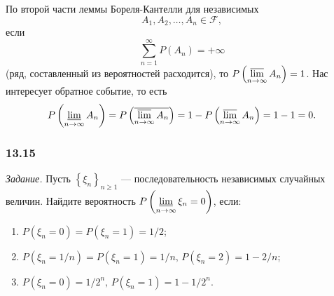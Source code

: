 По второй части леммы Бореля-Кантелли для независимых
$$A_1, A_2, \dotsc, A_n \in \mathcal{F},$$
если
$$ \sum \limits_{n=1}^{ \infty } P \left( A_n \right) =
+ \infty $$
(ряд, составленный из вероятностей расходится), то $P \left( \varlimsup \limits_{n \to \infty } A_n \right) = 1$.
Нас интересует обратное событие,
то есть
$$P \left( \varliminf \limits_{n \to \infty } A_n \right) =
P \left( \overline{ \varlimsup \limits_{n \to \infty } A_n} \right) =
1 - P \left( \varlimsup \limits_{n \to \infty } A_n \right) =
1 - 1 =
0.$$

\subsubsection*{13.15}

\textit{Задание.} Пусть $ \left\{ \xi_n \right\}_{n \geq 1}$ --- последовательность независимых случайных величин.
Найдите вероятность $P \left( \varliminf \limits_{n \to \infty } \xi_n = 0 \right) $, если:
\begin{enumerate}[label=\alph*)]
\item $P \left( \xi_n = 0 \right) = P \left( \xi_n = 1 \right) = 1/2$;
\item $P \left( \xi_n = 1/n \right) = P \left( \xi_n = 1 \right) = 1/n, \, P \left( \xi_n = 2 \right) = 1 - 2/n$;
\item $P \left( \xi_n = 0 \right) = 1/2^n, \, P \left( \xi_n = 1 \right) = 1 - 1/2^n$.
\end{enumerate}

